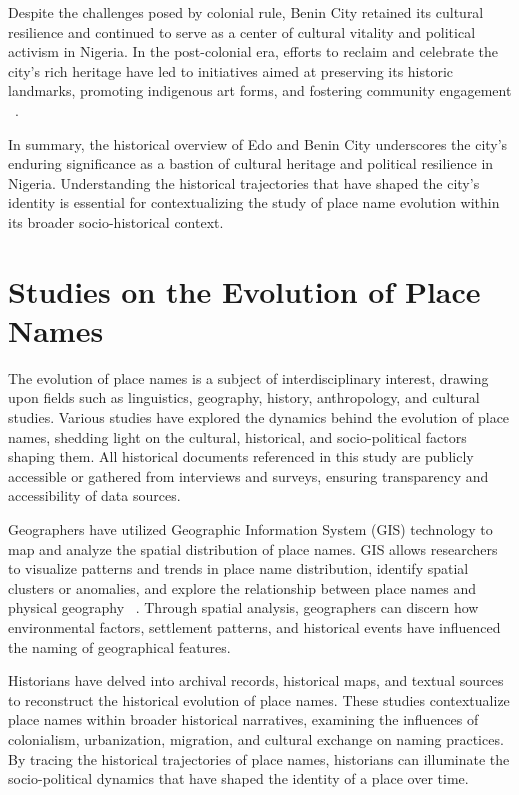 Despite the challenges posed by colonial rule, Benin City retained its cultural resilience and continued to serve as a center of cultural vitality and political activism in Nigeria. In the post-colonial era, efforts to reclaim and celebrate the city's rich heritage have led to initiatives aimed at preserving its historic landmarks, promoting indigenous art forms, and fostering community engagement ~\cite{falola2008history}.

In summary, the historical overview of Edo and Benin City underscores the city's enduring significance as a bastion of cultural heritage and political resilience in Nigeria. Understanding the historical trajectories that have shaped the city's identity is essential for contextualizing the study of place name evolution within its broader socio-historical context.

\section{Studies on the Evolution of Place Names}
The evolution of place names is a subject of interdisciplinary interest, drawing upon fields such as linguistics, geography, history, anthropology, and cultural studies. Various studies have explored the dynamics behind the evolution of place names, shedding light on the cultural, historical, and socio-political factors shaping them. All historical documents referenced in this study are publicly accessible or gathered from interviews and surveys, ensuring transparency and accessibility of data sources.

Geographers have utilized Geographic Information System (GIS) technology to map and analyze the spatial distribution of place names. GIS allows researchers to visualize patterns and trends in place name distribution, identify spatial clusters or anomalies, and explore the relationship between place names and physical geography ~\cite{Bolstad}. Through spatial analysis, geographers can discern how environmental factors, settlement patterns, and historical events have influenced the naming of geographical features.

Historians have delved into archival records, historical maps, and textual sources to reconstruct the historical evolution of place names. These studies contextualize place names within broader historical narratives, examining the influences of colonialism, urbanization, migration, and cultural exchange on naming practices. By tracing the historical trajectories of place names, historians can illuminate the socio-political dynamics that have shaped the identity of a place over time.

